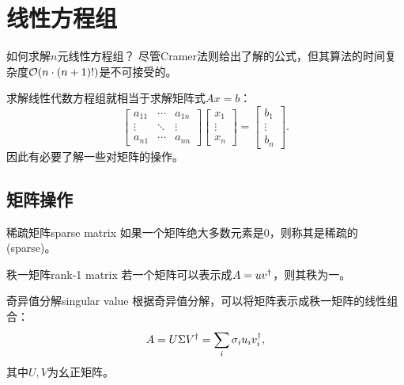 \chapter{线性方程组}

如何求解$n$元线性方程组？
尽管Cramer法则给出了解的公式，但其算法的时间复杂度$\mathcal{O}(n \cdot (n + 1)!)$是不可接受的。

\iffalse
求解线性代数方程组就相当于求解矩阵式$Ax=b$：
\begin{equation}
    \begin{bmatrix}
        a_{11}&\cdots&a_{1n}\\
        \vdots&\ddots&\vdots\\
        a_{n1}&\cdots&a_{nn}
    \end{bmatrix}\begin{bmatrix}
        x_1\\\vdots\\x_n
    \end{bmatrix}=\begin{bmatrix}
        b_1\\\vdots\\b_n
    \end{bmatrix}.
\end{equation}
因此有必要了解一些对矩阵的操作。

\section{矩阵操作}

\begin{definition}
    {稀疏矩阵}{sparse matrix}
    如果一个矩阵绝大多数元素是0，则称其是稀疏的(sparse)。
\end{definition}

\begin{definition}
    {秩一矩阵}{rank-1 matrix}
    若一个矩阵可以表示成$A=uv^\dagger$，则其秩为一。
\end{definition}

\begin{theorem}
    {奇异值分解}{singular value}
    根据奇异值分解，可以将矩阵表示成秩一矩阵的线性组合：
    \begin{equation}
        A=U\Sigma V^\dagger=\sum_i\sigma_iu_iv_i^\dagger,
    \end{equation}
    其中$U,V$为幺正矩阵。
\end{theorem}

